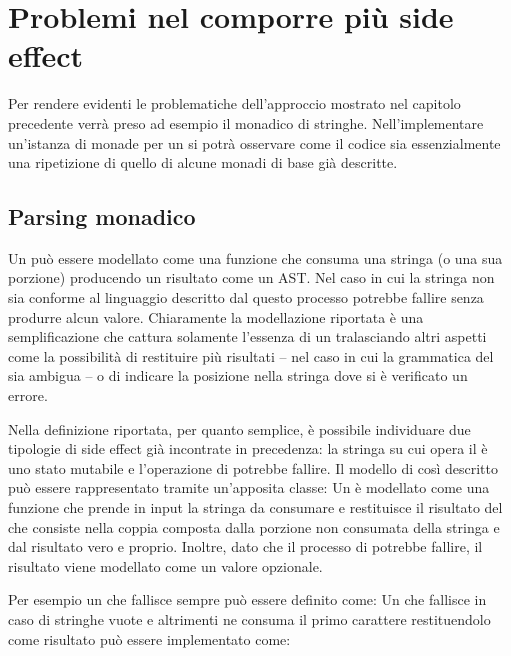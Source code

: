 \section{Problemi nel comporre più side effect}

Per rendere evidenti le problematiche dell'approccio mostrato nel capitolo precedente verrà preso ad esempio il  monadico di stringhe.
Nell'implementare un'istanza di monade per un  si potrà osservare come il codice sia essenzialmente una ripetizione di quello di alcune monadi di base già descritte.

\subsection{Parsing monadico}
\label{sec:parsing-monadico}
Un  può essere modellato come una funzione che consuma una stringa (o una sua porzione) producendo un risultato come un AST. Nel caso in cui la stringa non sia conforme al linguaggio descritto dal  questo processo potrebbe fallire senza produrre alcun valore.
Chiaramente la modellazione riportata è una semplificazione che cattura solamente l'essenza di un  tralasciando altri aspetti come la possibilità di restituire più risultati -- nel caso in cui la grammatica del  sia ambigua -- o di indicare la posizione nella stringa dove si è verificato un errore.

Nella definizione riportata, per quanto semplice, è possibile individuare due tipologie di side effect già incontrate in precedenza: la stringa su cui opera il  è uno stato mutabile e l'operazione di  potrebbe fallire.
Il modello di  così descritto può essere rappresentato tramite un'apposita classe:
Un  è modellato come una funzione che prende in input la stringa da consumare e restituisce il risultato del  che consiste nella coppia composta dalla porzione non consumata della stringa e dal risultato vero e proprio. Inoltre, dato che il processo di  potrebbe fallire, il risultato viene modellato come un valore opzionale.

Per esempio un  che fallisce sempre può essere definito come:
Un  che fallisce in caso di stringhe vuote e altrimenti ne consuma il primo carattere restituendolo come risultato può essere implementato come:

